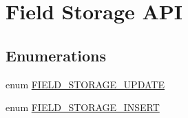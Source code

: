 \hypertarget{group__field__storage}{
\section{Field Storage API}
\label{group__field__storage}
}
\subsection*{Enumerations}
\begin{DoxyCompactItemize}
\item 
enum \hyperlink{group__field__storage_ga45ab1b1aff3e5823611963cca1565954}{FIELD\_\-STORAGE\_\-UPDATE} 
\item 
enum \hyperlink{group__field__storage_ga111f1bae2368f363e9d68469e8a11fdf}{FIELD\_\-STORAGE\_\-INSERT} 
\end{DoxyCompactItemize}
